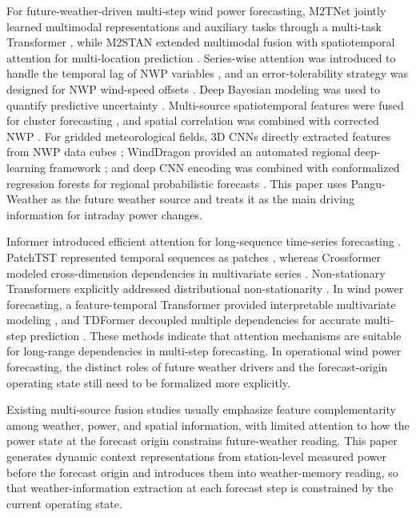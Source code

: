 For future-weather-driven multi-step wind power forecasting, M2TNet jointly learned multimodal representations and auxiliary tasks through a multi-task Transformer \cite{ref13}, while M2STAN extended multimodal fusion with spatiotemporal attention for multi-location prediction \cite{ref14}. Series-wise attention was introduced to handle the temporal lag of NWP variables \cite{ref15}, and an error-tolerability strategy was designed for NWP wind-speed offsets \cite{ref16}. Deep Bayesian modeling was used to quantify predictive uncertainty \cite{ref_liu_bayesian_uncertainty}. Multi-source spatiotemporal features were fused for cluster forecasting \cite{ref17}, and spatial correlation was combined with corrected NWP \cite{ref18}. For gridded meteorological fields, 3D CNNs directly extracted features from NWP data cubes \cite{ref19}; WindDragon provided an automated regional deep-learning framework \cite{ref20}; and deep CNN encoding was combined with conformalized regression forests for regional probabilistic forecasts \cite{ref21}. This paper uses Pangu-Weather as the future weather source \cite{ref22} and treats it as the main driving information for intraday power changes.

Informer introduced efficient attention for long-sequence time-series forecasting \cite{ref23}. PatchTST represented temporal sequences as patches \cite{ref24}, whereas Crossformer modeled cross-dimension dependencies in multivariate series \cite{ref25}. Non-stationary Transformers explicitly addressed distributional non-stationarity \cite{ref26}. In wind power forecasting, a feature-temporal Transformer provided interpretable multivariate modeling \cite{ref_liu_feature_temporal}, and TDFormer decoupled multiple dependencies for accurate multi-step prediction \cite{ref_liu_tdformer}. These methods indicate that attention mechanisms are suitable for long-range dependencies in multi-step forecasting. In operational wind power forecasting, the distinct roles of future weather drivers and the forecast-origin operating state still need to be formalized more explicitly.

Existing multi-source fusion studies usually emphasize feature complementarity among weather, power, and spatial information, with limited attention to how the power state at the forecast origin constrains future-weather reading. This paper generates dynamic context representations from station-level measured power before the forecast origin and introduces them into weather-memory reading, so that weather-information extraction at each forecast step is constrained by the current operating state.
